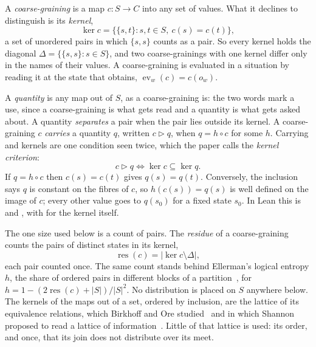 \documentclass[11pt]{amsart}
\DeclareMathOperator{\ev}{ev}
\DeclareMathOperator{\res}{res}
\theoremstyle{plain}
\begin{document}
A \emph{coarse-graining} is a map $c:S\to C$ into any set of values. What it declines to distinguish is its \emph{kernel},
\begin{equation}\label{eq:kernel}
  \ker c=\bigl\{\{s,t\}:s,t\in S,\ c(s)=c(t)\bigr\},
\end{equation}
a set of unordered pairs in which $\{s,s\}$ counts as a pair. So every kernel holds the diagonal $\Delta=\{\{s,s\}:s\in S\}$, and two coarse-grainings with one kernel differ only in the names of their values. A coarse-graining is evaluated in a situation by reading it at the state that obtains, $\ev_w(c)=c(o_w)$.

A \emph{quantity} is any map out of $S$, as a coarse-graining is: the two words mark a use, since a coarse-graining is what gets read and a quantity is what gets asked about. A quantity \emph{separates} a pair when the pair lies outside its kernel. A coarse-graining $c$ \emph{carries} a quantity $q$, written $c\rhd q$, when $q=h\circ c$ for some $h$. Carrying and kernels are one condition seen twice, which the paper calls the \emph{kernel criterion}:
\begin{equation}\label{eq:criterion}
  c\rhd q\iff\ker c\subseteq\ker q.
\end{equation}
If $q=h\circ c$ then $c(s)=c(t)$ gives $q(s)=q(t)$. Conversely, the inclusion says $q$ is constant on the fibres of $c$, so $h(c(s))=q(s)$ is well defined on the image of $c$; every other value goes to $q(s_0)$ for a fixed state $s_0$. In Lean this is  and , with  for the kernel itself.

The one size used below is a count of pairs. The \emph{residue} of a coarse-graining counts the pairs of distinct states in its kernel,
\begin{equation}\label{eq:residue}
  \res(c)=\bigl|\ker c\setminus\Delta\bigr|,
\end{equation}
each pair counted once. The same count stands behind Ellerman's logical entropy $h$, the share of ordered pairs in different blocks of a partition~\cite{Ellerman2009}, for $h=1-(2\res(c)+|S|)/|S|^2$. No distribution is placed on $S$ anywhere below. The kernels of the maps out of a set, ordered by inclusion, are the lattice of its equivalence relations, which Birkhoff and Ore studied~\cite{Birkhoff1935,Ore1942} and in which Shannon proposed to read a lattice of information~\cite{Shannon1953}. Little of that lattice is used: its order, and once, that its join does not distribute over its meet.
\end{document}
